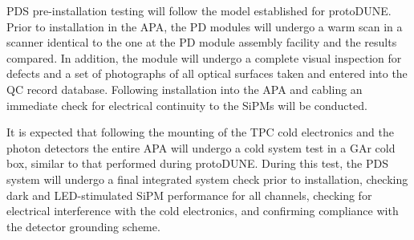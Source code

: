 PDS pre-installation testing will follow the model established for protoDUNE.  Prior to installation in the APA, the PD modules will undergo a warm scan in a scanner identical to the one at the PD module assembly facility and the results compared.  In addition, the module will undergo a complete visual inspection for defects and a set of photographs of all optical surfaces taken and entered into the QC record database.  Following installation into the APA and cabling an immediate check for electrical continuity to the SiPMs will be conducted.

It is expected that following the mounting of the TPC cold electronics and the photon detectors the entire APA will undergo a cold system test in a GAr cold box, similar to that performed during protoDUNE.  During this test, the PDS system will undergo a final integrated system check prior to installation, checking dark and LED-stimulated SiPM performance for all channels, checking for electrical interference with the cold electronics, and confirming compliance with the detector grounding scheme.
